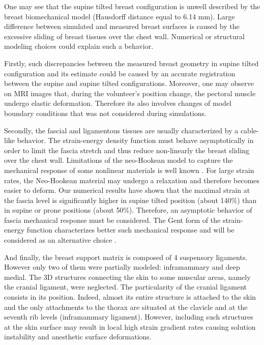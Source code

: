 One may see that the supine tilted breast configuration is unwell described by the breast biomechanical model (Hausdorff distance equal to 6.14 mm). Large difference between simulated and measured breast surfaces is caused by the excessive sliding of breast tissues over the chest wall. Numerical or structural modeling choices could explain such a behavior.

Firstly, such discrepancies between the measured breast geometry in supine tilted configuration and its estimate could be caused by an accurate registration between the supine and supine tilted configurations. Moreover, one may observe on MRI images that, during the volunteer's position change, the pectoral muscle undergo elastic deformation. Therefore its also involves changes of model boundary conditions that was not considered during simulations.

Secondly, the fascial and ligamentous tissues are usually characterized by a cable-like behavior. The strain-energy density function must behave asymptotically in order to limit the fascia stretch and thus reduce non-linearly the breast sliding over the chest wall. Limitations of the neo-Hookean model to capture the mechanical response of some nonlinear materials is well known \citep{kaliske_finite_1997}. For large strain rates, the Neo-Hookean material may undergo a relaxation and therefore becomes easier to deform.  Our numerical results have shown that the maximal strain at the fascia level is significantly higher in supine tilted position (about 140\%) than in supine or prone positions (about 50\%).  Therefore, an asymptotic behavior of fascia mechanical response must be considered.  The Gent  form of the strain-energy function characterizes better such mechanical response \citep{gent_new_1996} and will be considered as an alternative choice .

And finally, the breast support matrix is composed of 4 suspensory ligaments. However only two of them were partially modeled: inframammary and deep medial. The 3D structures connecting the skin to some muscular areas, namely the cranial ligament,  were neglected.  The particularity  of the cranial ligament consists in its position. Indeed,  almost its entire structure is attached to the skin and the only attachments to the thorax are situated at the clavicle and at the seventh rib levels (inframammary ligament). However, including such structures at the skin surface may result in local high strain gradient rates causing solution instability and anesthetic surface deformations. 
 

